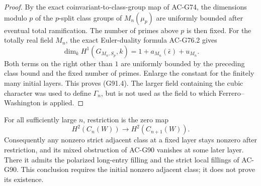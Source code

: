 \begin{proof}
By the exact coinvariant-to-class-group map of AC-G74,
the dimensions modulo $p$ of the $p$-split class groups of
$M_n(\mu_p)$ are uniformly bounded after eventual total
ramification.  The number of primes above $p$ is then fixed.
For the totally real field $M_n$, the exact Euler-duality
formula AC-G76.2 gives
\[
 \dim_k H^1(G_{M_n,S_p},k)
       =1+a_{M_n}(\bar\epsilon)+u_{M_n}.
 \tag{G91.6}
\]
Both terms on the right other than $1$ are uniformly bounded
by the preceding class bound and the fixed number of primes.
Enlarge the constant for the finitely many initial layers.
This proves (G91.4).  The larger field containing the cubic
character was used to define $\Gamma_n$, but is not used
as the field to which Ferrero--Washington is applied.
\end{proof}

\begin{theorem}
\label{thm:G91-kill}
For all sufficiently large $n$, restriction is the zero map
\[
                H^2(C_n(W))\longrightarrow H^2(C_{n+1}(W)).
 \tag{G91.7}
\]
Consequently any nonzero strict adjacent class at a fixed
layer stays nonzero after restriction, and its mixed
obstruction of AC-G90 vanishes at some later layer.
There it admits the polarized long-entry filling and the
strict local fillings of AC-G90.
This conclusion requires the initial nonzero adjacent class;
it does not prove its existence.
\end{theorem}

